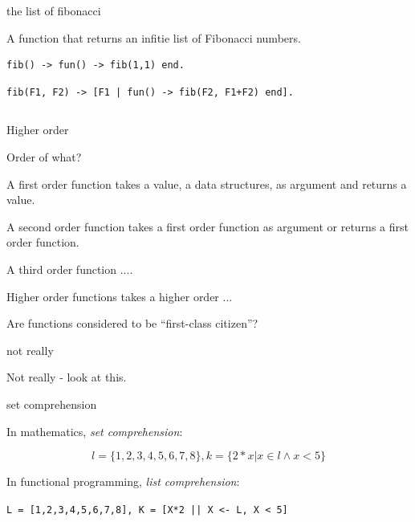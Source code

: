 \begin{frame}[fragile]{the list of fibonacci }

A function that returns an infitie list of Fibonacci numbers.

\pause\vspace{20pt}

\begin{verbatim}
fib() -> fun() -> fib(1,1) end.
\end{verbatim}
\pause
\begin{verbatim}
fib(F1, F2) -> [F1 | fun() -> fib(F2, F1+F2) end].
\end{verbatim}

\pause\vspace{20pt}

\begin{verbatim}
\end{verbatim}

\end{frame}

\begin{frame}{Higher order}

Order of what?

\pause\vspace{20pt}
A first order function takes a value, a data structures, as argument and returns a value.

\pause\vspace{20pt}
A second order function takes a first order function as argument or returns a first order function.

\pause\vspace{20pt}
A third order function ....

\pause\vspace{20pt}
Higher order functions takes a higher order ...

\pause\vspace{20pt}
Are functions considered to be ``first-class citizen''?
\end{frame}


\begin{frame}{not really}

\vspace{40pt}Not really - look at this.

\end{frame}

\begin{frame}{set comprehension}

In mathematics, {\em set comprehension}:

$$l = \lbrace 1,2,3,4,5,6,7,8 \rbrace ,  k = \lbrace 2*x | x \in l \wedge x < 5 \rbrace$$

\pause In functional programming, {\em list comprehension}:

\pause 
\vspace{20pt}\hspace{40pt} {\tt L = [1,2,3,4,5,6,7,8], K = [X*2 || X <- L, X < 5]}


\end{frame}

